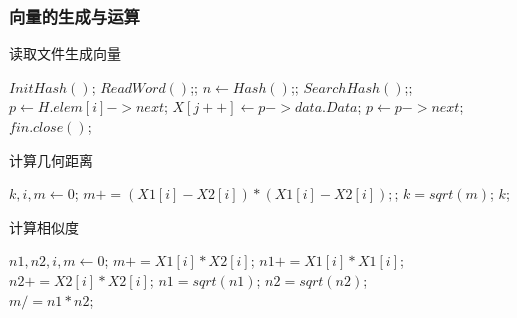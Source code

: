 \documentclass[a4paper]{article}
\begin{document}
	\subsubsection{向量的生成与运算}
	\begin{algorithm}[H]
		\caption{读取文件生成向量}
		\begin{algorithmic}[1] %
				\State $InitHash()$;
					\State $ReadWord()$;;
					\State $n \gets Hash()$;;
					\State $SearchHash()$;;
				\EndWhile
					\State $p \gets H.elem[i]->next$;
						\State $X[j++] \gets p->data.Data$;
						\State $p \gets p->next$;
					\EndWhile
				\EndFor
				\State $fin.close()$;
			\EndFunction
		\end{algorithmic}\label{alg:algorithm3}
	\end{algorithm}

	\begin{algorithm}[H]
		\caption{计算几何距离}
		\begin{algorithmic}[1] %
				\State $k,i,m \gets 0$;
				\For{$each\ i\ in\ [0,16)$}
					\State $m += (X1[i] - X2[i]) * (X1[i] - X2[i]);$;
				\EndFor
				\State $k = sqrt(m)$;
				\Return $k$;
			\EndFunction
		\end{algorithmic}\label{alg:algorithm4}
	\end{algorithm}

	\begin{algorithm}[H]
		\caption{计算相似度}
		\begin{algorithmic}[1] %
				\State $n1,n2,i,m \gets 0$;
				\For{$each\ i\ in\ [0,16)$}
					\State $m += X1[i] * X2[i]$;
					\State $n1 += X1[i] * X1[i]$;
					\State $n2 += X2[i] * X2[i]$;
				\EndFor
				\State $n1 = sqrt(n1)$;
				\State $n2 = sqrt(n2)$;\\
				\Return $m /= n1 * n2$;
			\EndFunction
		\end{algorithmic}\label{alg:algorithm5}
	\end{algorithm}
\end{document}
